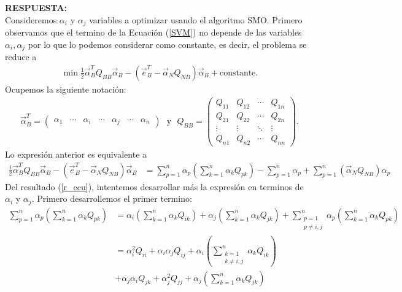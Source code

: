 \documentclass[11pt,letterpaper]{article}
\newcommand{\res}{\textbf{RESPUESTA:}\\}
\newcommand{\sumk}{\sum_{k=1}^n}
\begin{document}
\begin{enumerate}
\res Consideremos $\alpha_i$ y $\alpha_j$ variables a optimizar usando el algoritmo SMO. Primero observamos que el termino de la Ecuación (\ref{SVM}) no depende de las variables $\alpha_i, \alpha_j$ por lo que lo podemos considerar como constante, es decir, el problema se reduce a 
\begin{align*}
\min \frac{1}{2}\overrightarrow{\alpha}_{B}^T Q_{BB}\overrightarrow{\alpha}_B-(\overrightarrow{e}_B^T-\overrightarrow{\alpha}_N Q_{NB})\overrightarrow{\alpha}_B+\text{constante}.
\end{align*}
Ocupemos la siguiente notación:
\begin{align*}
\overrightarrow{\alpha}_{B}^T= \begin{pmatrix}
\alpha_1&\cdots &\alpha_i &\cdots&\alpha_j&\cdots&\alpha_n
\end{pmatrix} \ \ \ \text{y}\ \ \ Q_{BB}=\begin{pmatrix}
Q_{11} & Q_{12} & \cdots & Q_{1n}\\
Q_{21} & Q_{22} & \cdots & Q_{2n}\\
\vdots & \vdots & \ddots & \vdots\\
Q_{n1}& Q_{n2}& \cdots & Q_{nn}
\end{pmatrix}.
\end{align*}
Lo expresión anterior es equivalente a 
\begin{align}\label{r_ecu}
\frac{1}{2}\overrightarrow{\alpha}_{B}^T Q_{BB}\overrightarrow{\alpha}_B-(\overrightarrow{e}_B^T-\overrightarrow{\alpha}_N Q_{NB})\overrightarrow{\alpha}_B&= \sum_{p=1}^n \alpha_p \left( \sumk \alpha_k Q_{pk}\right)-\sum_{p=1}^n \alpha_p +\sum_{p=1}^n \left(\overrightarrow{\alpha}_N Q_{NB}\right)\alpha_p
\end{align}
Del resultado (\ref{r_ecu}), intentemos desarrollar más la expresión en terminos de $\alpha_i$ y $\alpha_j$. Primero desarrollemos el primer termino:
\begin{align*}
\sum_{p=1}^n \alpha_p \left( \sumk \alpha_k Q_{pk}\right)&=\alpha_i\left( \sumk \alpha_k Q_{ik}\right)+\alpha_j \left( \sumk \alpha_k Q_{jk}\right)+\sum_{\substack{p=1 \\ p\neq i,j}}^n \alpha_p \left( \sumk \alpha_k Q_{pk}\right)\\
&=\alpha_i^2Q_{ii}+\alpha_i\alpha_jQ_{ij} + \alpha_i \left( \sum_{\substack{k=1\\ k\neq i,j}}^n  \alpha_k Q_{ik}\right)\\
&+\alpha_j\alpha_iQ_{jk}+\alpha_j^2Q_{jj}+\alpha_j \left( \sumk \alpha_k Q_{jk}\right)\\

\end{align*}
\end{enumerate}
\end{document}
